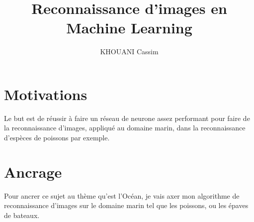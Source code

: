 \documentclass[a4paper,10pt]{report}
\title{Reconnaissance d'images en Machine Learning}
\author{\textsc{KHOUANI} Cassim}
\date{} %
\begin{document}
\maketitle

\section*{Motivations}
Le but est de réussir à faire un réseau de neurone assez performant pour faire de la reconnaissance d'images, appliqué au domaine marin, dans la reconnaissance d'espèces de poissons par exemple.

\section*{Ancrage}
Pour ancrer ce sujet au thème qu'est l'Océan, je vais axer mon algorithme de reconnaissance d'images sur le domaine marin tel que les poissons, ou les épaves de bateaux.
​
\end{document}
